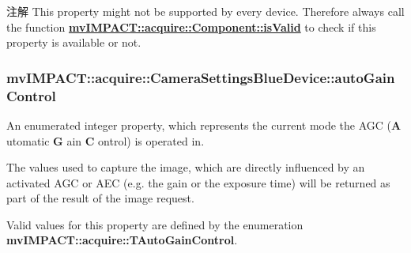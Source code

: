 \begin{DoxyNote}{注解}
This property might not be supported by every device. Therefore always call the function {\bfseries \hyperlink{classmv_i_m_p_a_c_t_1_1acquire_1_1_component_ac51e55e7e046101f3c6119d84123abd5}{mv\+I\+M\+P\+A\+C\+T\+::acquire\+::\+Component\+::is\+Valid}} to check if this property is available or not. 
\end{DoxyNote}
\hypertarget{classmv_i_m_p_a_c_t_1_1acquire_1_1_camera_settings_blue_device_a9d65d62f763438188309c1807b7fc436}{
\subsubsection[{auto\+Gain\+Control}]{ mv\+I\+M\+P\+A\+C\+T\+::acquire\+::\+Camera\+Settings\+Blue\+Device\+::auto\+Gain\+Control}}\label{classmv_i_m_p_a_c_t_1_1acquire_1_1_camera_settings_blue_device_a9d65d62f763438188309c1807b7fc436}


An enumerated integer property, which represents the current mode the A\+G\+C ({\bfseries A} utomatic {\bfseries G} ain {\bfseries C} ontrol) is operated in. 

The values used to capture the image, which are directly influenced by an activated A\+G\+C or A\+E\+C (e.\+g. the gain or the exposure time) will be returned as part of the result of the image request.

Valid values for this property are defined by the enumeration {\bfseries mv\+I\+M\+P\+A\+C\+T\+::acquire\+::\+T\+Auto\+Gain\+Control}.

